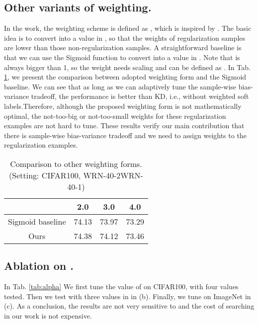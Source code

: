 \documentclass{article} \usepackage{iclr2021_conference,times}
\newcommand\revise[1]{#1}
\begin{document}
\revise{
\subsection{Other variants of weighting.} 
In the work, the weighting scheme is defined as , which is inspired by \citet{lin2017focal,tang2019learning}. The basic idea is to convert  into a value in , so that the weights of regularization samples are lower than those non-regularization samples. A straightforward baseline is that we can use the Sigmoid function to convert  into a value in . Note that   is always bigger than 1, so the weight needs scaling and can be defined as . In Tab. \ref{tab:sigmoid}, we present the comparison between adopted weighting form and the Sigmoid baseline. 
We can see that as long as we can adaptively tune the sample-wise bias-variance tradeoff, the performance is better than KD, i.e., without weighted soft labels.Therefore, although the proposed weighting form is not mathematically optimal, the not-too-big or not-too-small weights for these regularization examples are not hard to tune. These results verify our main contribution that there is sample-wise bias-variance tradeoff and we need to assign weights to the regularization examples. 
}

\begin{table}
\caption{Comparison to other weighting forms. (Setting: CIFAR100, WRN-40-2WRN-40-1)}\label{tab:sigmoid}
\begin{center}
\begin{tabular}{cccc}
\toprule
&2.0&3.0&4.0\\ \midrule
Sigmoid baseline&74.13&73.97&73.29\\
Ours&74.38&74.12&73.46\\\bottomrule
\end{tabular}
\end{center}
\end{table}

\revise{
\subsection{Ablation on .} In Tab. \ref{tab:alpha} We first tune the value of  on CIFAR100, with four values  tested. Then we test with three values in  in (b). Finally, we tune  on ImageNet in (c). As a conclusion, the results are not very sensitive to  and the cost of searching  in our work is not expensive.
}
\end{document}
